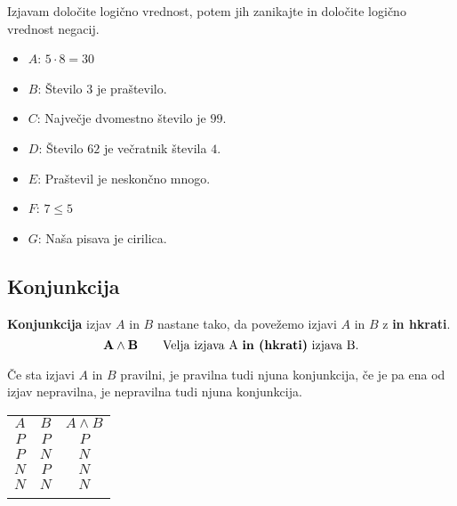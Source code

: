          
             \begin{naloga}
                Izjavam določite logično vrednost, potem jih zanikajte in določite logično vrednost negacij.
                \begin{itemize}
                    \item $A$: $5 \cdot 8 = 30$
                    \item $B$: Število $3$ je praštevilo.
                    \item $C$: Največje dvomestno število je $99$.
                    \item $D$: Število $62$ je večratnik števila $4$.
                    \item $E$: Praštevil je neskončno mnogo.
                    \item $F$: $7 \leq 5$
                    \item $G$: Naša pisava je cirilica.
                \end{itemize}
            \end{naloga}
         

         
             \subsection{Konjunkcija}
                \textbf{Konjunkcija} izjav $A$ in $B$ nastane tako, da povežemo izjavi $A$ in $B$ 
                z \textbf{in hkrati}.
                $$ \mathbf{A\land B} \quad \quad \textmd{Velja izjava A \textbf{in (hkrati)} izjava B.}$$
             
                        Če sta izjavi $A$ in $B$ pravilni, je pravilna tudi njuna konjunkcija, 
                        če je pa ena od izjav nepravilna, je nepravilna tudi njuna konjunkcija.
                     

                    \begin{table}[H]
                        \centering
                        \begin{tabular}{||c|c|c||} 
                        \hhline{|t:===:t|}
                        \rowcolor[rgb]{0.843,0.718,0.718} $A$ & $B$ & $A\land B$  \\ 
                        \hhline{|:===:|}
                        $P$ & $P$ & $P$                         \\ 
                        \hline
                        $P$ & $N$ & $N$                         \\ 
                        \hline
                        $N$ & $P$ & $N$                         \\ 
                        \hline
                        $N$ & $N$ & $N$                         \\
                        \hhline{|b:===:b|}
                        \end{tabular}
                    \end{table}

